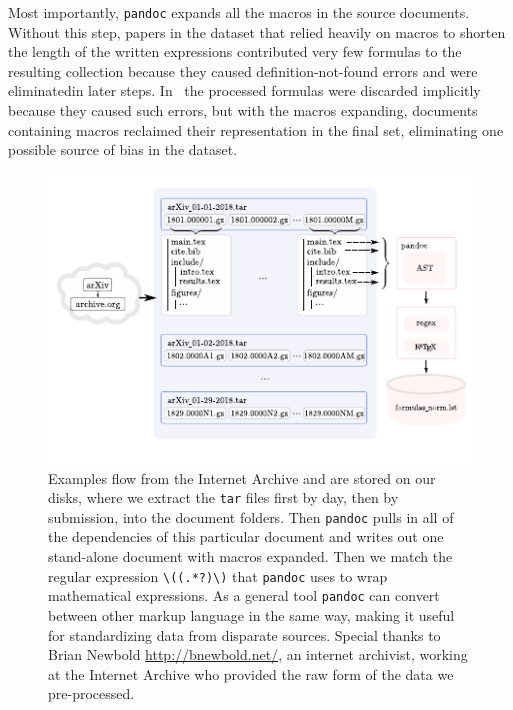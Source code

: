 \documentclass[12pt]{article}
\begin{document}
Most importantly, \texttt{pandoc} expands all the macros in the source
documents. Without this step, papers in the dataset that relied heavily on
macros to shorten the length of the written expressions contributed very few
formulas to the resulting collection because they caused definition-not-found
errors and were eliminatedin later steps. In~\cite{deng2016you} the processed
formulas were discarded implicitly because they caused such errors, but with the
macros expanding, documents containing macros reclaimed their representation in
the final set, eliminating one possible source of bias in the dataset.


\begin{figure}[tbp]
\begin{adjustwidth}{-1in}{-1in}%
		\includegraphics[scale=2.0]{harvest.pdf}
    \centering
\end{adjustwidth}
    \cprotect\caption{Examples flow from the Internet Archive and are stored on
    our disks, where we extract the \texttt{tar} files first by day, then by
    submission, into the document folders. Then \texttt{pandoc} pulls in all of
    the dependencies of this particular document and writes out one stand-alone
    document with macros expanded. Then we match the regular expression
    \verb|\((.*?)\)| that \texttt{pandoc} uses to wrap mathematical expressions.
    As a general tool \texttt{pandoc} can convert between other markup language
    in the same way, making it useful for standardizing data from disparate
    sources. Special thanks to Brian Newbold \url{http://bnewbold.net/}, an
    internet archivist, working at the Internet Archive who provided the raw
    form of the data we pre-processed.}\label{datapipeline}
\end{figure}
\end{document}
